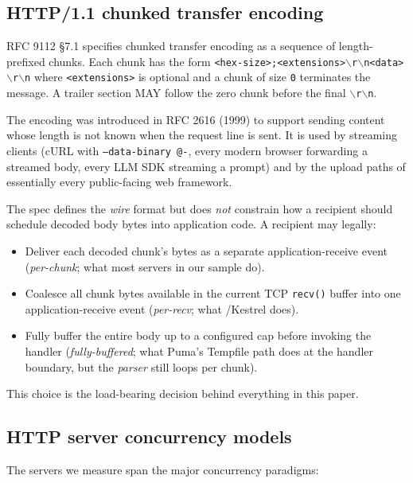 \subsection{HTTP/1.1 chunked transfer encoding}
\label{sec:bg-chunked}

RFC 9112 \S 7.1 \cite{rfc9112} specifies chunked transfer encoding
as a sequence of length-prefixed chunks. Each chunk has the form
\texttt{<hex-size>;<extensions>$\backslash$r$\backslash$n<data>$\backslash$r$\backslash$n}
where \texttt{<extensions>} is optional and a chunk of size
\texttt{0} terminates the message. A trailer section MAY follow the
zero chunk before the final \texttt{$\backslash$r$\backslash$n}.

The encoding was introduced in RFC 2616 (1999) to support sending
content whose length is not known when the request line is sent.
It is used by streaming clients (cURL with
\texttt{--data-binary @-}, every modern browser forwarding a
streamed body, every LLM SDK streaming a prompt) and by the upload
paths of essentially every public-facing web framework.

The spec defines the \emph{wire} format but does \emph{not}
constrain how a recipient should schedule decoded body bytes into
application code. A recipient may legally:
\begin{itemize}
  \item Deliver each decoded chunk's bytes as a separate
    application-receive event (\emph{per-chunk}; what most servers
    in our sample do).
  \item Coalesce all chunk bytes available in the current TCP
    \texttt{recv()} buffer into one application-receive event
    (\emph{per-recv}; what /Kestrel does).
  \item Fully buffer the entire body up to a configured cap before
    invoking the handler (\emph{fully-buffered}; what Puma's
    Tempfile path does at the handler boundary, but the
    \emph{parser} still loops per chunk).
\end{itemize}

This choice is the load-bearing decision behind everything in this
paper.

\subsection{HTTP server concurrency models}
\label{sec:bg-concurrency}

The servers we measure span the major concurrency paradigms:

